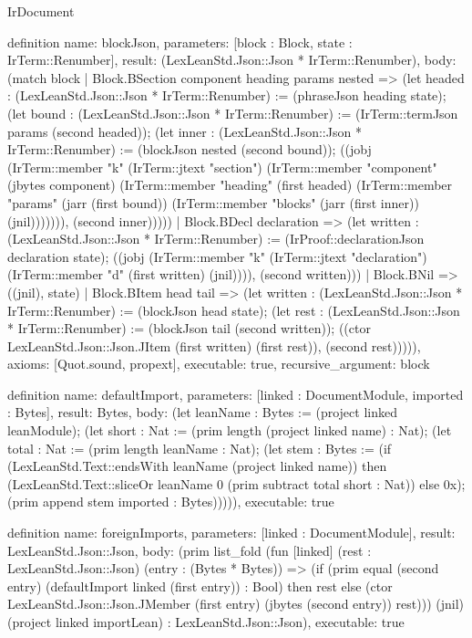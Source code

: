 \begin{lexlean}{IrDocument}
\begin{semanticmodule}
definition{
  name: blockJson,
  parameters: [block : Block, state : IrTerm::Renumber],
  result: (LexLeanStd.Json::Json * IrTerm::Renumber),
  body: (match block
    | Block.BSection component heading params nested => (let headed : (LexLeanStd.Json::Json * IrTerm::Renumber) := (phraseJson heading state); (let bound : (LexLeanStd.Json::Json * IrTerm::Renumber) := (IrTerm::termJson params (second headed)); (let inner : (LexLeanStd.Json::Json * IrTerm::Renumber) := (blockJson nested (second bound)); ((jobj (IrTerm::member "k" (IrTerm::jtext "section") (IrTerm::member "component" (jbytes component) (IrTerm::member "heading" (first headed) (IrTerm::member "params" (jarr (first bound)) (IrTerm::member "blocks" (jarr (first inner)) (jnil))))))), (second inner)))))
    | Block.BDecl declaration => (let written : (LexLeanStd.Json::Json * IrTerm::Renumber) := (IrProof::declarationJson declaration state); ((jobj (IrTerm::member "k" (IrTerm::jtext "declaration") (IrTerm::member "d" (first written) (jnil)))), (second written)))
    | Block.BNil => ((jnil), state)
    | Block.BItem head tail => (let written : (LexLeanStd.Json::Json * IrTerm::Renumber) := (blockJson head state); (let rest : (LexLeanStd.Json::Json * IrTerm::Renumber) := (blockJson tail (second written)); ((ctor LexLeanStd.Json::Json.JItem (first written) (first rest)), (second rest))))),
  axioms: [Quot.sound, propext],
  executable: true,
  recursive_argument: block
}

definition{
  name: defaultImport,
  parameters: [linked : DocumentModule, imported : Bytes],
  result: Bytes,
  body: (let leanName : Bytes := (project linked leanModule); (let short : Nat := (prim length (project linked name) : Nat); (let total : Nat := (prim length leanName : Nat); (let stem : Bytes := (if (LexLeanStd.Text::endsWith leanName (project linked name)) then (LexLeanStd.Text::sliceOr leanName 0 (prim subtract total short : Nat)) else 0x); (prim append stem imported : Bytes))))),
  executable: true
}

definition{
  name: foreignImports,
  parameters: [linked : DocumentModule],
  result: LexLeanStd.Json::Json,
  body: (prim list_fold (fun [linked] (rest : LexLeanStd.Json::Json) (entry : (Bytes * Bytes)) => (if (prim equal (second entry) (defaultImport linked (first entry)) : Bool) then rest else (ctor LexLeanStd.Json::Json.JMember (first entry) (jbytes (second entry)) rest))) (jnil) (project linked importLean) : LexLeanStd.Json::Json),
  executable: true
}


\end{semanticmodule}
\end{lexlean}
